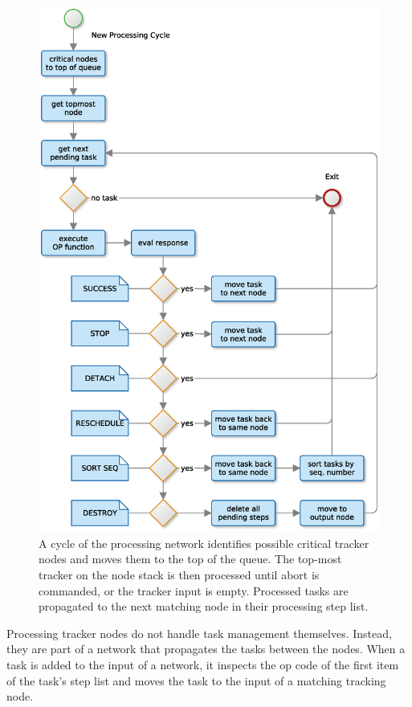 \begin{figure}%
\begin{center}
	\includegraphics[width=0.8\columnwidth]{images/proc_network}
	\caption{A cycle of the processing network identifies possible critical
	tracker nodes and moves them to the top of the queue. The top-most
	tracker on the node stack is then processed until abort is commanded,
	or the tracker input is empty. Processed tasks are propagated to
	the next matching node in their processing step list.}
	\label{fig:proc_network}
\end{center}
\end{figure}


Processing tracker nodes do not handle task management themselves. Instead,
they are part of a network that propagates the tasks between the nodes.
When a task is added to the input of a network, it inspects the op code of the first
item of the task's step list and moves the task to the input of a matching
tracking node.
\\

